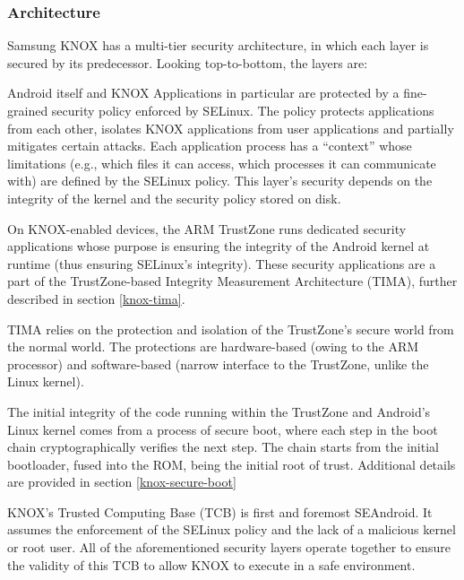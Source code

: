 \documentclass[11pt]{article}
\begin{document}
\subsubsection{Architecture}
Samsung KNOX has a multi-tier security architecture, in which each layer is secured by its predecessor.
Looking top-to-bottom, the layers are:
\begin{description}[itemsep=-2pt,topsep=2pt,leftmargin=1em]
  \item[SEAndroid] 
  	Android itself and KNOX Applications in particular are protected by a fine-grained security policy enforced by SELinux. 
  	The policy protects applications from each other, isolates KNOX applications from user applications and partially mitigates certain attacks. 
  	Each application process has a ``context'' whose limitations (e.g., which files it can access, which processes it can communicate with) are defined 
  	by the SELinux policy. This layer's security depends on the integrity of the kernel and the security policy stored on disk.
  \item[TIMA]
  	On KNOX-enabled devices, the ARM TrustZone runs dedicated security applications whose purpose is ensuring the integrity of the Android kernel at 
  	runtime (thus ensuring SELinux's integrity). These security applications are a part of the TrustZone-based Integrity Measurement Architecture (TIMA), 
  	further described in section \ref{knox-tima}.
  \item[TrustZone]
  	TIMA relies on the protection and isolation of the TrustZone's secure world from the normal world. The protections are hardware-based 
  	(owing to the ARM processor) and software-based (narrow interface to the TrustZone, unlike the Linux kernel).
  \item[Secure Boot]
  	The initial integrity of the code running within the TrustZone and Android's Linux kernel comes from a process of secure boot, 
  	where each step in the boot chain cryptographically verifies the next step. The chain starts from the initial bootloader, fused into the ROM, 
  	being the initial root of trust. Additional details are provided in section \ref{knox-secure-boot}
\end{description}

KNOX's Trusted Computing Base (TCB) is first and foremost SEAndroid. It assumes the enforcement of the SELinux policy and the lack of a malicious kernel or root user.
All of the aforementioned security layers operate together to ensure the validity of this TCB to allow KNOX to execute in a safe environment.
\end{document}
